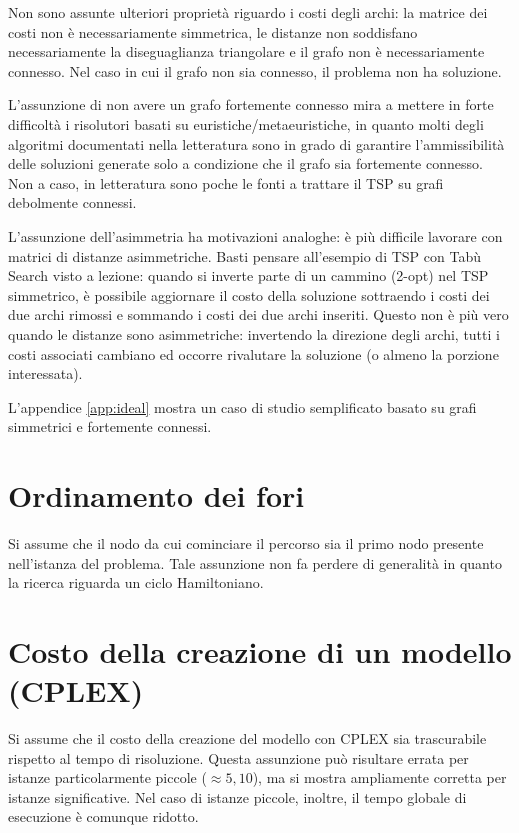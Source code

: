 \documentclass[a4paper, 10pt]{report}
\begin{document}
Non sono assunte ulteriori proprietà riguardo i costi degli archi: la
matrice dei costi non è necessariamente simmetrica, le distanze non
soddisfano necessariamente la diseguaglianza triangolare e il grafo non
è necessariamente  connesso. Nel caso in cui il grafo non sia connesso,
il problema non ha soluzione.

L'assunzione di non avere un grafo fortemente connesso mira a mettere
in forte difficoltà i risolutori basati su euristiche/metaeuristiche, in
quanto molti degli algoritmi documentati nella letteratura sono in grado di garantire
l'ammissibilità delle soluzioni generate solo a condizione che il grafo
sia fortemente connesso. Non a caso, in letteratura sono poche le fonti
a trattare il TSP su grafi debolmente connessi.

L'assunzione dell'asimmetria ha motivazioni analoghe: è più difficile
lavorare con matrici di distanze asimmetriche. Basti pensare all'esempio
di TSP con Tabù Search visto a lezione: quando si inverte parte di un
cammino (2-opt) nel TSP simmetrico, è possibile aggiornare il costo
della soluzione sottraendo i costi dei due archi rimossi e sommando i
costi dei due archi inseriti. Questo non è più vero quando le distanze sono
asimmetriche: invertendo la direzione degli archi, tutti i costi associati
cambiano ed occorre rivalutare la soluzione (o almeno la porzione
interessata).

L'appendice \ref{app:ideal} mostra un caso di studio semplificato basato
su grafi simmetrici e fortemente connessi.



\section{Ordinamento dei fori}
\label{sec:assumptions_ordering}
Si assume che il nodo da cui cominciare il percorso sia il primo
nodo presente nell'istanza del problema. Tale assunzione non fa perdere
di generalità in quanto la ricerca riguarda un ciclo Hamiltoniano.



\section{Costo della creazione di un modello (CPLEX)}
\label{sec:assumptions_CPLEX}
Si assume che il costo della creazione del modello con CPLEX sia
trascurabile rispetto al tempo di risoluzione. Questa assunzione può
risultare errata per istanze particolarmente piccole ($\approx 5, 10$),
ma si mostra ampliamente corretta per istanze significative. Nel caso di
istanze piccole, inoltre, il tempo globale di esecuzione è comunque
ridotto.
\end{document}
